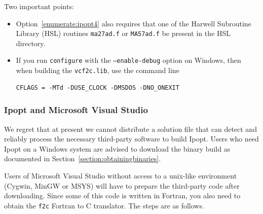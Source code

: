 \documentclass[11pt]{article}
\renewcommand{\_}{{\char"5F}}
\renewcommand{\{}{{\char"7B}}
\renewcommand{\}}{{\char"7D}}
\renewcommand{\^}{{\char"0D}}
\renewcommand{\'}{{\char"0D}}
\newif\ifipopt  \ipopttrue      %
\begin{document}
\noindent Two important points:


\begin{itemize}
\item Option~\ref{enumerate:ipopt4} also requires that one of the Harwell Subroutine Library (HSL) routines
{\tt ma27ad.f} or {\tt MA57ad.f} be present in the HSL directory.

\item If you run {\tt configure} with the {\tt --enable-debug} option on Windows, then when building the {\tt vcf2c.lib}, use the command line

\begin{verbatim}
CFLAGS = -MTd -DUSE_CLOCK -DMSDOS -DNO_ONEXIT
\end{verbatim}

\end{itemize}
%

\vskip 8pt

\ifipopt
\subsubsection{Ipopt and Microsoft Visual Studio} \label{section:ipopt-msvs}

We regret that at present we cannot distribute a solution file
that can detect and reliably process the necessary third-party software to
build Ipopt. Users who need Ipopt on a Windows system are advised to download
the binary build as documented in Section~\ref{section:obtainingbinaries}.


\iffalse %
Users of Microsoft Visual Studio without access to a unix-like environment (Cygwin, MinGW or MSYS)
will have to prepare the third-party code after downloading. Since some of this code is written in Fortran,
you also need to obtain the {\tt f2c} Fortran to C translator. The steps are as follows.
\end{document}
